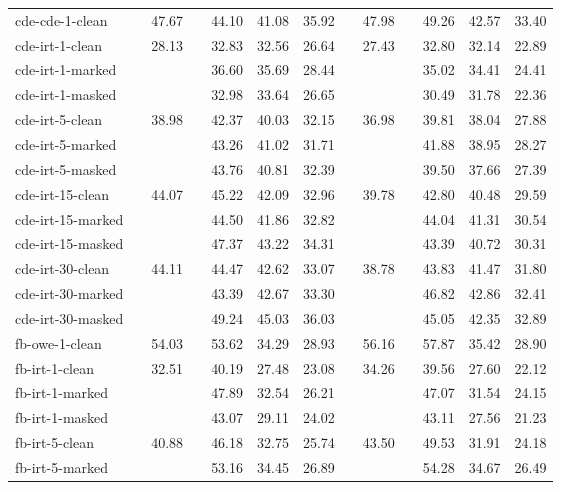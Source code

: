 \begin{tabular}{ l c r c r r r c r c r r r }
    cde-cde-1-clean    && 47.67 && 44.10 & 41.08 & 35.92 && 47.98 && 49.26 & 42.57 & 33.40 \\ \addlinespace
    cde-irt-1-clean    && 28.13 && 32.83 & 32.56 & 26.64 && 27.43 && 32.80 & 32.14 & 22.89 \\
    cde-irt-1-marked   &&       && 36.60 & 35.69 & 28.44 &&       && 35.02 & 34.41 & 24.41 \\
    cde-irt-1-masked   &&       && 32.98 & 33.64 & 26.65 &&       && 30.49 & 31.78 & 22.36 \\ \addlinespace
    cde-irt-5-clean    && 38.98 && 42.37 & 40.03 & 32.15 && 36.98 && 39.81 & 38.04 & 27.88 \\
    cde-irt-5-marked   &&       && 43.26 & 41.02 & 31.71 &&       && 41.88 & 38.95 & 28.27 \\
    cde-irt-5-masked   &&       && 43.76 & 40.81 & 32.39 &&       && 39.50 & 37.66 & 27.39 \\ \addlinespace
    cde-irt-15-clean   && 44.07 && 45.22 & 42.09 & 32.96 && 39.78 && 42.80 & 40.48 & 29.59 \\
    cde-irt-15-marked  &&       && 44.50 & 41.86 & 32.82 &&       && 44.04 & 41.31 & 30.54 \\
    cde-irt-15-masked  &&       && 47.37 & 43.22 & 34.31 &&       && 43.39 & 40.72 & 30.31 \\ \addlinespace
    cde-irt-30-clean   && 44.11 && 44.47 & 42.62 & 33.07 && 38.78 && 43.83 & 41.47 & 31.80 \\
    cde-irt-30-marked  &&       && 43.39 & 42.67 & 33.30 &&       && 46.82 & 42.86 & 32.41 \\
    cde-irt-30-masked  &&       && 49.24 & 45.03 & 36.03 &&       && 45.05 & 42.35 & 32.89 \\ \midrule
    fb-owe-1-clean     && 54.03 && 53.62 & 34.29 & 28.93 && 56.16 && 57.87 & 35.42 & 28.90 \\ \addlinespace
    fb-irt-1-clean     && 32.51 && 40.19 & 27.48 & 23.08 && 34.26 && 39.56 & 27.60 & 22.12 \\
    fb-irt-1-marked    &&       && 47.89 & 32.54 & 26.21 &&       && 47.07 & 31.54 & 24.15 \\
    fb-irt-1-masked    &&       && 43.07 & 29.11 & 24.02 &&       && 43.11 & 27.56 & 21.23 \\ \addlinespace
    fb-irt-5-clean     && 40.88 && 46.18 & 32.75 & 25.74 && 43.50 && 49.53 & 31.91 & 24.18 \\
    fb-irt-5-marked    &&       && 53.16 & 34.45 & 26.89 &&       && 54.28 & 34.67 & 26.49 \\

\end{tabular}

